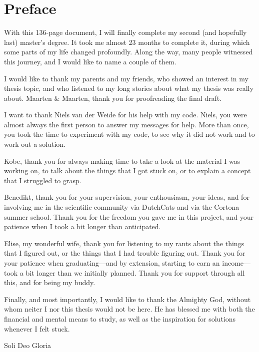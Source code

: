 \chapter{\label{chap:Preface}Preface}

With this 136-page document, I will finally complete my second (and hopefully last) master's degree. It took me almost 23 months to complete it, during which some parts of my life changed profoundly. Along the way, many people witnessed this journey, and I would like to name a couple of them.

I would like to thank my parents and my friends, who showed an interest in my thesis topic, and who listened to my long stories about what my thesis was really about.
Maarten \& Maarten, thank you for proofreading the final draft.

I want to thank Niels van der Weide for his help with my code. Niels, you were almost always the first person to answer my messages for help. More than once, you took the time to experiment with my code, to see why it did not work and to work out a solution.

Kobe, thank you for always making time to take a look at the material I was working on, to talk about the things that I got stuck on, or to explain a concept that I struggled to grasp.

Benedikt, thank you for your supervision, your enthousiasm, your ideas, and for involving me in the scientific community via DutchCats and via the Cortona summer school. Thank you for the freedom you gave me in this project, and your patience when I took a bit longer than anticipated.

Elise, my wonderful wife, thank you for listening to my rants about the things that I figured out, or the things that I had trouble figuring out. Thank you for your patience when graduating---{}and by extension, starting to earn an income---{}took a bit longer than we initially planned. Thank you for support through all this, and for being my buddy.

Finally, and most importantly, I would like to thank the Almighty God, without whom neiter I nor this thesis would not be here. He has blessed me with both the financial and mental means to study, as well as the inspiration for solutions whenever I felt stuck.

\newpage

\thispagestyle{empty}

\vspace*{\fill}
\begin{center}
    Soli Deo Gloria
\end{center}
\vspace*{\fill}
